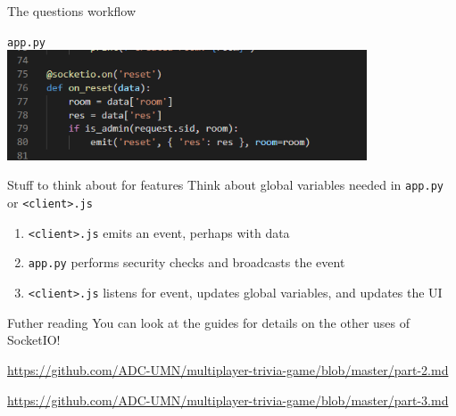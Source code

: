 \documentclass{beamer}
\begin{document}
\begin{frame}{The questions workflow}
{\begin{center}
			\texttt{app.py} \\
			\includegraphics[width=0.8\textwidth]{figs/reset.png}
		\end{center}
	}
\end{frame}

\begin{frame}{Stuff to think about for features}
	Think about global variables needed in \texttt{app.py} or \texttt{<client>.js} \pause

	\bigskip

	\begin{enumerate}
		\item \texttt{<client>.js} emits an event, perhaps with data \pause
		\item \texttt{app.py} performs security checks and broadcasts the event \pause
		\item \texttt{<client>.js} listens for event, updates global variables, and updates the UI
	\end{enumerate}
\end{frame}

\begin{frame}{Futher reading}
	You can look at the guides for details on the other uses of SocketIO!

	\bigskip

	\href{https://github.com/ADC-UMN/multiplayer-trivia-game/blob/master/part-2.md}{https://github.com/ADC-UMN/multiplayer-trivia-game/blob/master/part-2.md}

	\bigskip

	\href{https://github.com/ADC-UMN/multiplayer-trivia-game/blob/master/part-3.md}{https://github.com/ADC-UMN/multiplayer-trivia-game/blob/master/part-3.md}
\end{frame}
\end{document}
